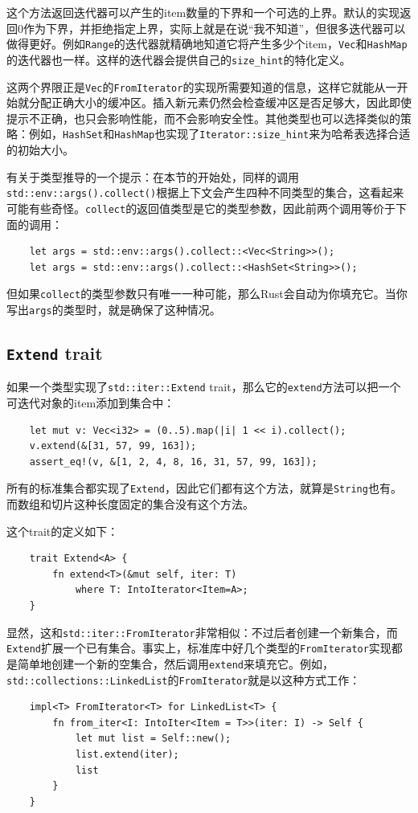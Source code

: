 这个方法返回迭代器可以产生的item数量的下界和一个可选的上界。默认的实现返回0作为下界，并拒绝指定上界，实际上就是在说“我不知道”，但很多迭代器可以做得更好。例如\texttt{Range}的迭代器就精确地知道它将产生多少个item，\texttt{Vec}和\texttt{HashMap}的迭代器也一样。这样的迭代器会提供自己的\texttt{size\_hint}的特化定义。

这两个界限正是\texttt{Vec}的\texttt{FromIterator}的实现所需要知道的信息，这样它就能从一开始就分配正确大小的缓冲区。插入新元素仍然会检查缓冲区是否足够大，因此即使提示不正确，也只会影响性能，而不会影响安全性。其他类型也可以选择类似的策略：例如，\texttt{HashSet}和\texttt{HashMap}也实现了\texttt{Iterator::size\_hint}来为哈希表选择合适的初始大小。

有关于类型推导的一个提示：在本节的开始处，同样的调用\texttt{std::env::args().collect()}根据上下文会产生四种不同类型的集合，这看起来可能有些奇怪。\texttt{collect}的返回值类型是它的类型参数，因此前两个调用等价于下面的调用：
\begin{verbatim}
    let args = std::env::args().collect::<Vec<String>>();
    let args = std::env::args().collect::<HashSet<String>>();
\end{verbatim}

但如果\texttt{collect}的类型参数只有唯一一种可能，那么Rust会自动为你填充它。当你写出\texttt{args}的类型时，就是确保了这种情况。

\subsection{\texttt{Extend} trait}\label{extend}
如果一个类型实现了\texttt{std::iter::Extend} trait，那么它的\texttt{extend}方法可以把一个可迭代对象的item添加到集合中：
\begin{verbatim}
    let mut v: Vec<i32> = (0..5).map(|i| 1 << i).collect();
    v.extend(&[31, 57, 99, 163]);
    assert_eq!(v, &[1, 2, 4, 8, 16, 31, 57, 99, 163]);
\end{verbatim}

所有的标准集合都实现了\texttt{Extend}，因此它们都有这个方法，就算是\texttt{String}也有。而数组和切片这种长度固定的集合没有这个方法。

这个trait的定义如下：
\begin{verbatim}
    trait Extend<A> {
        fn extend<T>(&mut self, iter: T)
            where T: IntoIterator<Item=A>;
    }
\end{verbatim}
显然，这和\texttt{std::iter::FromIterator}非常相似：不过后者创建一个新集合，而\texttt{Extend}扩展一个已有集合。事实上，标准库中好几个类型的\texttt{FromIterator}实现都是简单地创建一个新的空集合，然后调用\texttt{extend}来填充它。例如，\texttt{std::collections::LinkedList}的\texttt{FromIterator}就是以这种方式工作：
\begin{verbatim}
    impl<T> FromIterator<T> for LinkedList<T> {
        fn from_iter<I: IntoIter<Item = T>>(iter: I) -> Self {
            let mut list = Self::new();
            list.extend(iter);
            list
        }
    }
\end{verbatim}

